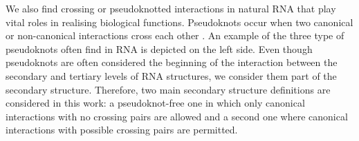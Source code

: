 We also find crossing or pseudoknotted interactions in natural RNA that play vital roles in realising biological functions. Pseudoknots occur when two canonical or non-canonical interactions cross each other \cite{beyongWCpairs}. An example of the three type of pseudoknots often find in RNA is depicted on the left side. Even though pseudoknots are often considered the beginning of the interaction between the secondary and tertiary levels of RNA structures, we consider them part of the secondary structure. Therefore, two main secondary structure definitions are considered in this work: a pseudoknot-free one in which only canonical interactions with no crossing pairs are allowed and a second one where canonical interactions with possible crossing pairs are permitted. 



